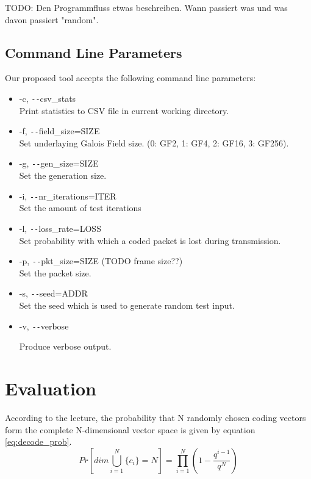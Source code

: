 \documentclass[a4paper,english,10pt]{tumarticle}
\begin{document}
TODO: Den Programmfluss etwas beschreiben. Wann passiert was und was davon passiert "random".

\subsection{Command Line Parameters}\label{app:cmd}
Our proposed tool accepts the following command line parameters:

\begin{itemize}
    \item -c, \texttt{-{}-}csv\_stats\\
    Print statistics to CSV file in current working directory.

    \item -f, \texttt{-{}-}field\_size=SIZE\\
    Set underlaying Galois Field size. (0: GF2, 1: GF4, 2: GF16, 3: GF256).

    \item -g, \texttt{-{}-}gen\_size=SIZE\\
    Set the generation size.

    \item -i, \texttt{-{}-}nr\_iterations=ITER\\
    Set the amount of test iterations

    \item -l, \texttt{-{}-}loss\_rate=LOSS\\
    Set probability with which a coded packet is lost during transmission.

    \item -p, \texttt{-{}-}pkt\_size=SIZE (TODO frame size??)\\
    Set the packet size.

    \item -s, \texttt{-{}-}seed=ADDR\\
    Set the seed which is used to generate random test input.
    \item -v, \texttt{-{}-}verbose

    Produce verbose output.
\end{itemize}

\section{Evaluation}\label{eval}
According to the lecture, the probability that N randomly chosen coding vectors form
the complete N-dimensional vector space is given by equation \ref{eq:decode_prob}.
\begin{equation} 
  Pr[dim\bigcup_{i=1}^{N}\{c_i\} = N] = \prod_{i=1}^{N} (1 - \frac{q^{i - 1}}{q ^ {N}})
  \label{eq:decode_prob}
\end{equation}
\end{document}
